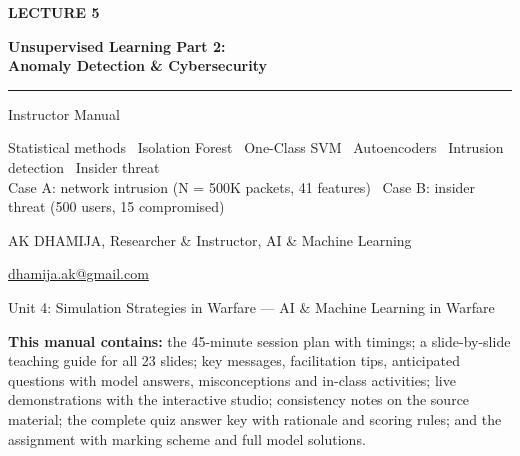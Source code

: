 \documentclass[11pt]{article}
\begin{document}
\begin{titlepage}\centering\vspace*{2.2cm}
{\color{AccN}\large\bfseries LECTURE 5\par}\vspace{0.6cm}
{\color{NavyN}\Huge\bfseries Unsupervised Learning Part 2:\\Anomaly Detection \& Cybersecurity\par}\vspace{0.6cm}
{\color{AccN}\rule{0.7\textwidth}{1.5pt}}\par\vspace{0.6cm}
{\LARGE Instructor Manual\par}\vspace{0.4cm}
{\large\begin{minipage}{0.85\textwidth}\centering Statistical methods \textbullet\ Isolation Forest \textbullet\ One-Class SVM \textbullet\ Autoencoders \textbullet\ Intrusion detection \textbullet\ Insider threat\\Case A: network intrusion (N = 500K packets, 41 features) \textbullet\ Case B: insider threat (500 users, 15 compromised)\end{minipage}\par}\vspace{2cm}
{\large AK DHAMIJA, Researcher \& Instructor, AI \& Machine Learning\par}\vspace{0.2cm}
{\normalsize \href{mailto:dhamija.ak@gmail.com}{dhamija.ak@gmail.com} \quad\textbullet{}\par}\vspace{0.3cm}
{Unit 4: Simulation Strategies in Warfare --- AI \& Machine Learning in Warfare\par}\vfill
\begin{tcolorbox}[colback=NavyN!4,colframe=NavyN,boxrule=0.6pt,arc=2pt,width=0.9\textwidth]\small
\textbf{This manual contains:} the 45-minute session plan with timings; a slide-by-slide teaching guide for all 23 slides; key messages, facilitation tips, anticipated questions with model answers, misconceptions and in-class activities; live demonstrations with the interactive studio; consistency notes on the source material; the complete quiz answer key with rationale and scoring rules; and the assignment with marking scheme and full model solutions.
\end{tcolorbox}
\end{titlepage}
\tableofcontents\newpage
\end{document}
